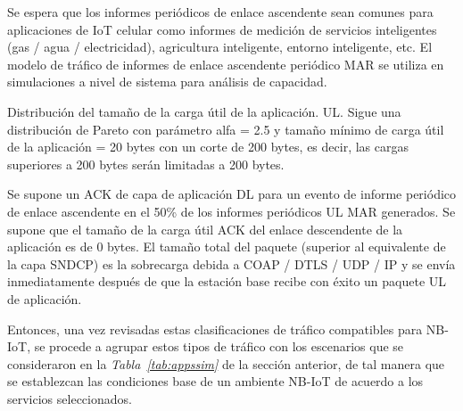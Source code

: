 Se espera que los informes periódicos de enlace ascendente sean comunes para aplicaciones de IoT celular como informes de medición de servicios inteligentes (gas / agua / electricidad), agricultura inteligente, entorno inteligente, etc. El modelo de tráfico de informes de enlace ascendente periódico MAR se utiliza en simulaciones a nivel de sistema para análisis de capacidad.\newline

Distribución del tamaño de la carga útil de la aplicación. UL. Sigue una distribución de Pareto con parámetro alfa = 2.5 y tamaño mínimo de carga útil de la aplicación = 20 bytes con un corte de 200 bytes, es decir, las cargas superiores a 200 bytes serán limitadas a 200 bytes.\newline

Se supone un ACK de capa de aplicación DL para un evento de informe periódico de enlace ascendente en el 50\% de los informes periódicos UL MAR generados. Se supone que el tamaño de la carga útil ACK del enlace descendente de la aplicación es de 0 bytes. El tamaño total del paquete (superior al equivalente de la capa SNDCP) es la sobrecarga debida a COAP / DTLS / UDP / IP y se envía inmediatamente después de que la estación base recibe con éxito un paquete UL de aplicación.\newline

Entonces, una vez revisadas estas clasificaciones de tráfico compatibles para NB-IoT, se procede a agrupar estos tipos de tráfico con los escenarios que se consideraron en la \textit{Tabla~\ref{tab:appssim}} de la sección anterior, de tal manera que se establezcan las condiciones base de un ambiente NB-IoT de acuerdo a los servicios seleccionados.\newline

